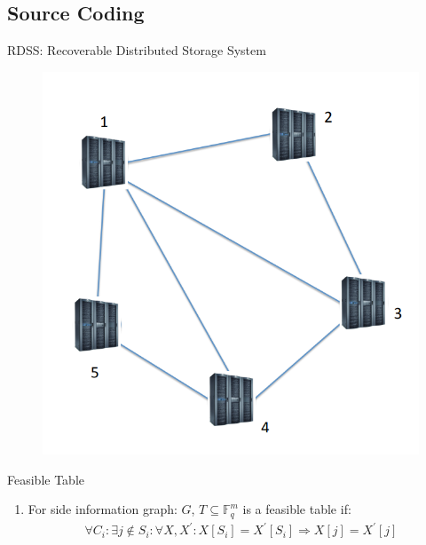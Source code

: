 \documentclass[xcolor=dvipsnames, aspectratio=169]{beamer}
\begin{document}
\subsection{Source Coding}
\begin{frame}{RDSS: Recoverable Distributed Storage System}
	\begin{figure}
		\centering
		\includegraphics[width=0.5\linewidth]{img/aryaaa}
		\label{fig:aryaaa}
	\end{figure}
	
\end{frame}
\begin{frame}{Feasible Table }
	\begin{enumerate}[]
		\item<1->[]
		\begin{definition}
			For side information graph: $G$, $T \subseteq \mathbb{F}_q^m$ is a feasible table if:
			\begin{align*}
				\forall C_i: \exists j \notin S_i: \forall X, X^\prime: X[S_i] = {X^\prime}[S_i]  \Rightarrow X[j] = {X^\prime}[j]
			\end{align*}
		\end{definition}
			\end{enumerate}
	\end{frame}
\end{document}
